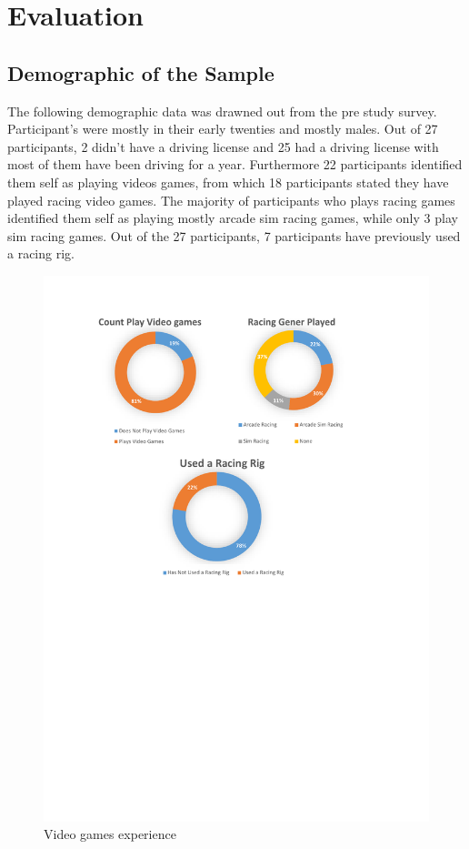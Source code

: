 \section{Evaluation}
%
%

\subsection{Demographic of the Sample}

The following demographic data was drawned out from the pre study survey. Participant's were mostly in their early twenties and mostly males. Out of 27 participants, 2 didn't have a driving license and 25 had a driving license with most of them have been driving for a year. Furthermore 22 participants identified them self as playing videos games, from which 18 participants stated they have played racing video games. The majority of participants who plays racing games identified them self as playing mostly arcade sim racing games, while only 3 play sim racing games. Out of the 27 participants, 7 participants have previously used a racing rig.

\begin{figure}[!htb]
	\centering
	\includegraphics[width=\textwidth]{charts/gamesxp.pdf}
	\caption[Gaming xp]{Video games experience}
	\label{fig:chart-gamesxp}
\end{figure}

